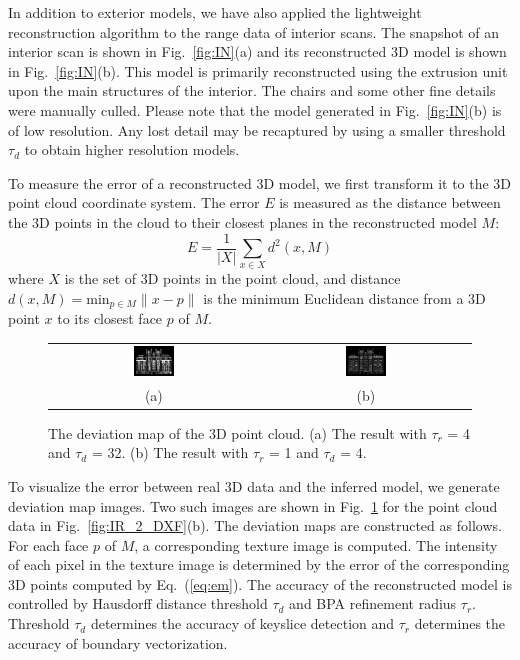 \documentclass[review]{acmsiggraph}       %
\newcommand{\Eq}[1] {Eq.~(\ref{eq:#1})}
\newcommand{\Fig}[1]{Fig.~\ref{fig:#1}}
\newcommand{\Figa}[1]{Fig.~\ref{fig:#1}(a)}
\newcommand{\Figb}[1]{Fig.~\ref{fig:#1}(b)}
\begin{document}
In addition to exterior models, we have also applied the lightweight
reconstruction algorithm to the range data of interior scans.
The snapshot of an interior scan is shown in \Figa{IN}
and its reconstructed 3D model is shown in \Figb{IN}.
This model is primarily reconstructed using the extrusion unit
upon the main structures of the interior.
The chairs and some other fine details were manually culled.
Please note that the model generated in \Figb{IN} is of low resolution.
Any lost detail may be recaptured by using a smaller threshold $\tau_d$
to obtain higher resolution models.

To measure the error of a reconstructed 3D model, we first transform it
to the 3D point cloud coordinate system.
The error $E$ is measured as the distance between the 3D points in the cloud
to their closest planes in the reconstructed model $M$:
\begin{equation}
E = \frac{1}{|X|}\sum_{x\in{X}}{d^2(x, M)}
\label{eq:em}
\end{equation}
where $X$ is the set of 3D points in the point cloud, and distance
$d(x, M) = \text{min}_{p \in M}\lVert x - p \lVert$ is the minimum
Euclidean distance from a 3D point $x$ to its closest face $p$ of $M$.

\begin{figure} [htbp]
\begin{center}
\begin{tabular}{cc}
\includegraphics[width=0.2\textwidth]{error_1000_32_4.png} &
\includegraphics[width=0.2\textwidth]{error_1000_4_1.png} \\
(a) & (b)
\end{tabular}
\end{center}
\caption{The deviation map of the 3D point cloud. (a) The result with $\tau_r$ = 4 and $\tau_d$ = 32.
(b) The result with $\tau_r$ = 1 and $\tau_d$ = 4. }
\label{fig:EM}
\end{figure}

To visualize the error between real 3D data and the inferred model,
we generate deviation map images.
Two such images are shown in \Fig{EM} for the point cloud data in
\Figb{IR_2_DXF}.
The deviation maps are constructed as follows.
For each face $p$ of $M$, a corresponding texture image is computed.
The intensity of each pixel in the texture image is determined by the error
of the corresponding 3D points computed by \Eq{em}.
The accuracy of the reconstructed model is controlled by Hausdorff distance
threshold $\tau_d$ and BPA refinement radius $\tau_r$.
Threshold $\tau_d$ determines the accuracy of keyslice detection and $\tau_r$
determines the accuracy of boundary vectorization.
\end{document}
